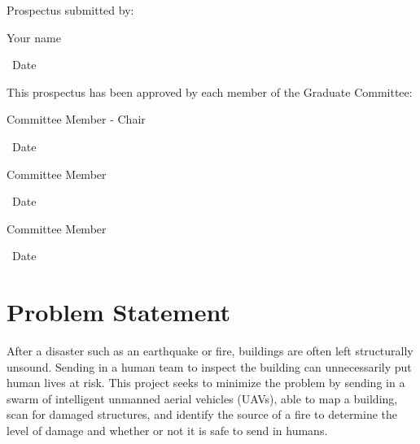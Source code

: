 \documentclass[12pt, letterpaper]{article}
\begin{document}
\hspace*{.47in}
\begin{minipage}[c]{5.25in}

\normalsize

Prospectus submitted by:

\vspace{.5in}

\makebox[2in]{\hrulefill} \hspace{1in} \makebox[2in]{\hrulefill}

\parbox[b]{3in}{Your name} \, Date
\vspace{0.5in}

This prospectus has been approved by each member of the Graduate Committee:
\vspace{0.5in}

\makebox[2in]{\hrulefill} \hspace{1in} \makebox[2in]{\hrulefill}

\parbox[b]{3in}{Committee Member - Chair} \, Date
\vspace{0.4in}

\makebox[2in]{\hrulefill} \hspace{1in} \makebox[2in]{\hrulefill}

\parbox[b]{3in}{Committee Member} \, Date
\vspace{0.4in}

\makebox[2in]{\hrulefill} \hspace{1in} \makebox[2in]{\hrulefill}

\parbox[b]{3in}{Committee Member} \, Date

\end{minipage}

\vspace*{\fill}

\pagebreak

\setcounter{page}{1}

\section{Problem Statement}
After a disaster such as an earthquake or fire, buildings are often left structurally unsound. Sending in a human team to inspect the building can unnecessarily put human lives at risk. This project seeks to minimize the problem by sending in a swarm of intelligent unmanned aerial vehicles (UAVs), able to map a building, scan for damaged structures, and identify the source of a fire to determine the level of damage and whether or not it is safe to send in humans. 
\end{document}
